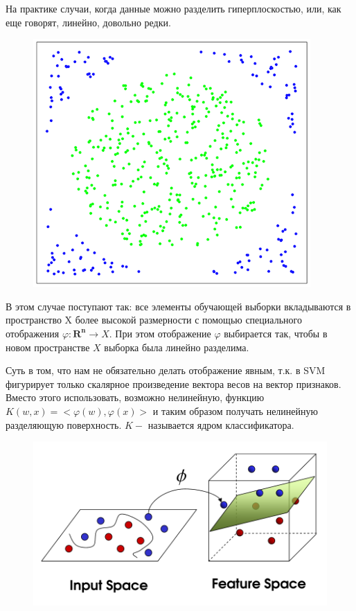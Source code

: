 \documentclass[paper=a4, fontsize=11pt]{scrartcl} %
\numberwithin{equation}{section} %
\numberwithin{figure}{section} %
\numberwithin{table}{section} %
\begin{document}
	На практике случаи, когда данные можно разделить гиперплоскостью, или, как еще говорят, линейно, довольно редки.
	\begin{figure}[h!]
		\centering
		\includegraphics[scale=0.45]{svm2}
	\end{figure}

	В этом случае поступают так: все элементы обучающей выборки вкладываются в пространство X более высокой размерности с помощью специального отображения $\varphi : \mathbf{R^n} \longrightarrow X$. При этом отображение $\varphi$ выбирается так, чтобы в новом пространстве $X$ выборка была линейно разделима.
	
	Суть в том, что нам не обязательно делать отображение явным, т.к. в SVM фигурирует только скалярное произведение вектора весов на вектор признаков. Вместо этого использовать, возможно нелинейную, функцию $K(w,x) = <\varphi(w), \varphi(x)>$ и таким образом получать нелинейную разделяющую поверхность. $K-$ называется ядром классификатора.
	
	\begin{figure}[h!]
		\centering
		\includegraphics[scale=0.35]{kernal1}
	\end{figure}
\end{document}
